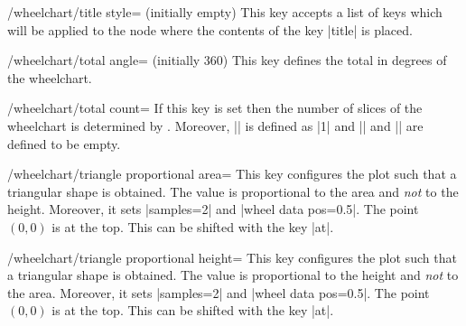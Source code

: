 \documentclass[a4paper,english,dvipsnames]{ltxdoc}
\begin{document}
\begin{stylekey}{/wheelchart/title style= (initially \normalfont empty)}
This key accepts a list of keys which will be applied to the node where the contents of the key |title| is placed.
\end{stylekey}
\begin{key}{/wheelchart/total angle= (initially 360)}
This key defines the total  in degrees of the wheelchart.
\end{key}
\begin{key}{/wheelchart/total count=}
If this key is set then the number of slices of the wheelchart is determined by . Moreover, |\WCvarA| is defined as |1| and |\WCvarB| and |\WCvarC| are defined to be empty.
\begin{codeexample}[width=10cm,preamble={\usepackage{siunitx}}]
\end{codeexample}
\end{key}
\begin{key}{/wheelchart/triangle proportional area=}
This key configures the plot such that a triangular shape is obtained. The value is proportional to the area and \emph{not} to the height. Moreover, it sets |samples=2| and |wheel data pos=0.5|. The point $(0,0)$ is at the top. This can be shifted with the key |at|.
\begin{codeexample}[width=10cm]
\begin{tikzpicture}
\wheelchart[
  triangle proportional area={5}{4},
  value=1
]{\exampleforthismanual}
\end{tikzpicture}
\end{codeexample}
\end{key}
\begin{key}{/wheelchart/triangle proportional height=}
This key configures the plot such that a triangular shape is obtained. The value is proportional to the height and \emph{not} to the area. Moreover, it sets |samples=2| and |wheel data pos=0.5|. The point $(0,0)$ is at the top. This can be shifted with the key |at|.
\begin{codeexample}[width=10cm]
\begin{tikzpicture}
\wheelchart[
  triangle proportional height={5}{4},
  value=1
]{\exampleforthismanual}
\end{tikzpicture}
\end{codeexample}
\end{key}
\end{document}
